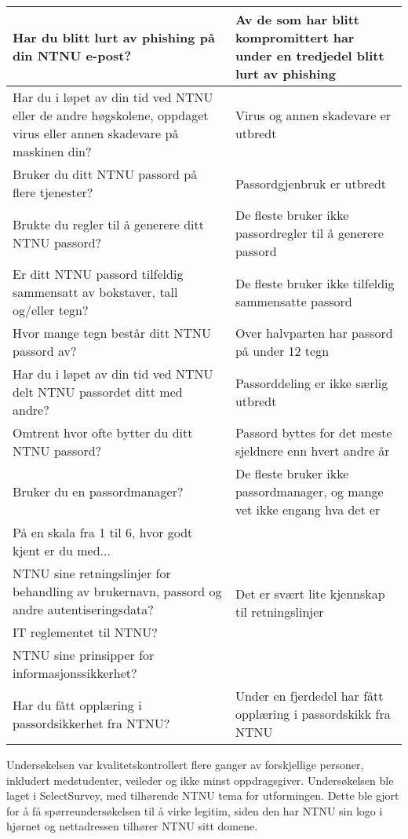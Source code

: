 \begin{table}[H]
\begin{tabular}{|p{20.215em}|p{20.57em}|}
    \hline
    Har du blitt lurt av phishing på din NTNU e-post? & Av de som har blitt kompromittert har under en tredjedel blitt lurt av phishing \\
    \hline
    Har du i løpet av din tid ved NTNU eller de andre høgskolene, oppdaget virus eller annen skadevare på maskinen din? & Virus og annen skadevare er utbredt \\
    \hline
    Bruker du ditt NTNU passord på flere tjenester? & Passordgjenbruk er utbredt \\
    \hline
    Brukte du regler til å generere ditt NTNU passord? & De fleste bruker ikke passordregler til å generere passord \\
    \hline
    Er ditt NTNU passord tilfeldig sammensatt av bokstaver, tall og/eller tegn? & De fleste bruker ikke tilfeldig sammensatte passord \\
    \hline
    Hvor mange tegn består ditt NTNU passord av? & Over halvparten har passord på under 12 tegn \\
    \hline
    Har du i løpet av din tid ved NTNU delt NTNU passordet ditt med andre? & Passorddeling er ikke særlig utbredt \\
    \hline
    Omtrent hvor ofte bytter du ditt NTNU passord? & Passord byttes for det meste sjeldnere enn hvert andre år \\
    \hline
    Bruker du en passordmanager? & De fleste bruker ikke passordmanager, og mange vet ikke engang hva det er \\
    \hline
    På en skala fra 1 til 6, hvor godt kjent er du med... & \multirow{4}[2]{*}{Det er svært lite kjennskap til retningslinjer} \\
    NTNU sine retningslinjer for behandling av brukernavn, passord og andre autentiseringsdata? & \multicolumn{1}{r|}{} \\
    IT reglementet til NTNU? & \multicolumn{1}{r|}{} \\
    NTNU sine prinsipper for informasjonssikkerhet? & \multicolumn{1}{r|}{} \\
    \hline
    Har du fått opplæring i passordsikkerhet fra NTNU? & Under en fjerdedel har fått opplæring i passordskikk fra NTNU \\
    \hline
    \end{tabular}%
  \label{tab:hypoteser}%
\end{table}%

Undersøkelsen var kvalitetskontrollert flere ganger av forskjellige personer, inkludert medstudenter, veileder og ikke minst oppdragsgiver. Undersøkelsen ble laget i SelectSurvey, med tilhørende NTNU tema for utformingen. Dette ble gjort for å få spørreundersøkelsen til å virke legitim, siden den har NTNU sin logo i hjørnet og nettadressen tilhører NTNU sitt domene. 

